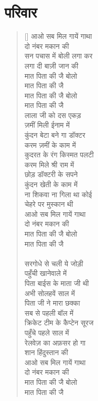 \chapter{ \texthindi{परिवार} }

\begin{verse}[\versewidth]\texthindi{
आओ सब मिल गायें गाथा\\
दो नंबर मकान की\\
सन पचास में बोली लगा कर\\
लगा दी बाज़ी जान की\\
मात पिता की जै बोलो\\
मात पिता की जै\\
मात पिता की जै बोलो\\
मात पिता की जै\\
लाला जी को दस एकड़\\
ज़मीं मिली ईनाम में\\
कुंदन बेटा बने गा डॉक्टर\\
करम ज़मीं के काम में\\
कुदरत के रंग किस्मत पलटी\\
करम मिले श्री राम में\\
छोड़ डॉक्टरी के सपने\\
कुंदन खेती के काम में\\
ना शिकवा ना गिला था कोई\\
चेहरे पर मुस्कान थी\\
आओ सब मिल गायें गाथा\\
दो नंबर मकान की\\
मात पिता की जै बोलो\\
मात पिता की जै\\
\\
सरगोधे से चली ये जोड़ी\\
पहुँची खानेवाले में\\
पिता बाईस के माता जी थी\\
अभी सोलहवें साल में\\
पिता जी ने मारा छक्का\\
सब से पहली बॉल में\\
क्रिकेट टीम के कैप्टेन सूरज\\
पहुँचे पहले साल में\\
रेलवेज़ का अफ़सर हो गा\\
शान हिंदुस्तान की\\
आओ सब मिल गायें गाथा\\
दो नंबर मकान की\\
मात पिता की जै बोलो\\
मात पिता की जै\\

}
\end{verse}
